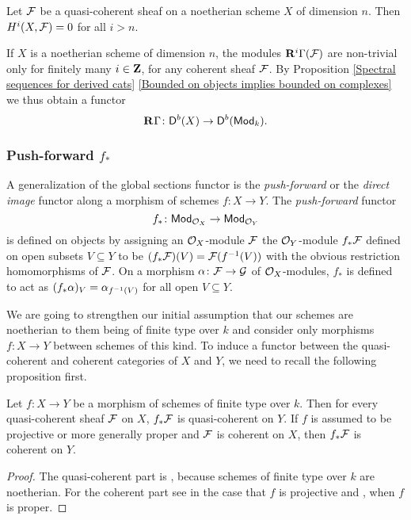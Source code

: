 \begin{theorem}
    \label{Grothendieck vanishig}
    Let $\mathcal F$ be a quasi-coherent sheaf on a noetherian scheme $X$ of dimension $n$. Then $H^i(X, \mathcal F) = 0$ for all $i > n$.
\end{theorem}
\noindent
If $X$ is a noetherian scheme of dimension $n$, the modules $\mathbf{R}^{i}\Gamma(\mathcal F)$ are non-trivial only for finitely many $i \in \mathbf Z$, for any coherent sheaf $\mathcal F$. By Proposition \ref{Spectral sequences for derived cats} \ref{Bounded on objects implies bounded on complexes} we thus obtain a functor
\[
    \mathbf{R}^{}\Gamma \colon \mathsf{D}^b(X) \to \mathsf{D}^b(\mathsf{Mod}_{k}).
\]


\subsubsection{Push-forward $f_*$}
A generalization of the global sections functor is the \emph{push-forward} or the \emph{direct image} functor along a morphism of schemes $f \colon X \to Y$. The \emph{push-forward} functor
\[
    f_* \colon \mathsf{Mod}_{{\mathcal{O}_{X}}} \to \mathsf{Mod}_{{\mathcal{O}_{Y}}}
\]
is defined on objects by assigning an ${\mathcal{O}_{X}}$-module $\mathcal F$ the ${\mathcal{O}_{Y}}$-module $f_*\mathcal F$ defined on open subsets $V \subseteq Y$ to be $(f_*\mathcal F)(V) = \mathcal F(f^{-1}(V))$ with the obvious restriction homomorphisms of $\mathcal F$. On a morphism $\alpha \colon \mathcal F \to \mathcal G$ of ${\mathcal{O}_{X}}$-modules, $f_*$ is defined to act as $(f_*\alpha)_V = \alpha_{f^{-1}(V)}$ for all open $V \subseteq Y$. 

We are going to strengthen our initial assumption that our schemes are noetherian to them being of finite type over $k$ 
and consider only morphisms $f \colon X \to Y$ between schemes of this kind. 
To induce a functor between the quasi-coherent and coherent categories of $X$ and $Y$, we need to recall the following proposition first.

\begin{proposition}
    \label{push-forward of coherent and quasi coherent shaves}
    Let $f \colon X \to Y$ be a morphism of schemes of finite type over $k$. Then for every quasi-coherent sheaf $\mathcal F$ on $X$, $f_*\mathcal F$ is quasi-coherent on $Y$. If $f$ is assumed to be projective or more generally proper and $\mathcal F$ is coherent on $X$, then $f_*\mathcal F$ is coherent on $Y$.
\end{proposition}

\begin{proof}
    The quasi-coherent part is \cite[\S II, Proposition 5.8]{Hartshorne1977}, because schemes of finite type over $k$ are noetherian. For the coherent part see \cite[\S II, Proposition 5.20]{Hartshorne1977} in the case that $f$ is projective and \cite[Part III, \S 3.2, Theorem 3.2.1]{EGA}, when $f$ is proper.
\end{proof}

